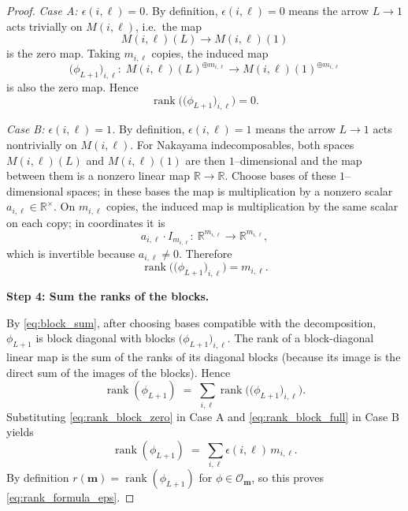 \documentclass{article}
\newcommand{\rank}{\operatorname{rank}}
\theoremstyle{definition}
\begin{document}
\begin{proof}
\smallskip\noindent
\emph{Case A: $\epsilon(i,\ell)=0$.}
By definition, $\epsilon(i,\ell)=0$ means the arrow $L\to 1$ acts trivially on $M(i,\ell)$, i.e.\ the map
\[
M(i,\ell)(L)\to M(i,\ell)(1)
\]
is the zero map. Taking $m_{i,\ell}$ copies, the induced map
\[
\big(\phi_{L+1}\big)_{i,\ell}:\;
M(i,\ell)(L)^{\oplus m_{i,\ell}}
\to
M(i,\ell)(1)^{\oplus m_{i,\ell}}
\]
is also the zero map. Hence
\begin{equation}
\label{eq:rank_block_zero}
\rank\big(\big(\phi_{L+1}\big)_{i,\ell}\big)=0.
\end{equation}

\smallskip\noindent
\emph{Case B: $\epsilon(i,\ell)=1$.}
By definition, $\epsilon(i,\ell)=1$ means the arrow $L\to 1$ acts nontrivially on $M(i,\ell)$.
For Nakayama indecomposables, both spaces $M(i,\ell)(L)$ and $M(i,\ell)(1)$ are then $1$--dimensional and
the map between them is a nonzero linear map $\mathbb{R}\to \mathbb{R}$.
Choose bases of these $1$--dimensional spaces; in these bases the map is multiplication by a nonzero scalar
$a_{i,\ell}\in \mathbb{R}^\times$.
On $m_{i,\ell}$ copies, the induced map is multiplication by the same scalar on each copy; in coordinates it is
\[
a_{i,\ell}\cdot I_{m_{i,\ell}}:\ \mathbb{R}^{m_{i,\ell}}\to \mathbb{R}^{m_{i,\ell}},
\]
which is invertible because $a_{i,\ell}\neq 0$. Therefore
\begin{equation}
\label{eq:rank_block_full}
\rank\big(\big(\phi_{L+1}\big)_{i,\ell}\big)=m_{i,\ell}.
\end{equation}

\medskip\noindent
\textbf{Step 4: Sum the ranks of the blocks.}

By \eqref{eq:block_sum}, after choosing bases compatible with the decomposition,
$\phi_{L+1}$ is block diagonal with blocks $\big(\phi_{L+1}\big)_{i,\ell}$.
The rank of a block-diagonal linear map is the sum of the ranks of its diagonal blocks
(because its image is the direct sum of the images of the blocks).
Hence
\[
\rank(\phi_{L+1})
\;=\;
\sum_{i,\ell}\rank\big(\big(\phi_{L+1}\big)_{i,\ell}\big).
\]
Substituting \eqref{eq:rank_block_zero} in Case A and \eqref{eq:rank_block_full} in Case B yields
\[
\rank(\phi_{L+1})
\;=\;
\sum_{i,\ell}\epsilon(i,\ell)\,m_{i,\ell}.
\]
By definition $r(\mathbf m)=\rank(\phi_{L+1})$ for $\phi\in\mathcal O_{\mathbf m}$, so this proves
\eqref{eq:rank_formula_eps}. 
\end{proof}
\end{document}
